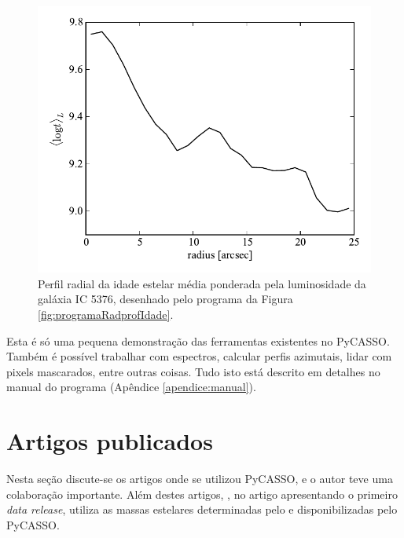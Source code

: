 \begin{figure}
	\includegraphics{figuras/radprof-idade}
	\caption[Perfil radial da idade estelar média da galáxia IC 5376] {Perfil
	radial da idade estelar média ponderada pela luminosidade da galáxia IC
	5376, desenhado pelo programa da Figura \ref{fig:programaRadprofIdade}.}
	\label{fig:radprofIdade}
\end{figure}

Esta é só uma pequena demonstração das ferramentas existentes no PyCASSO. Também
é possível trabalhar com espectros, calcular perfis azimutais, lidar com pixels
mascarados, entre outras coisas. Tudo isto está descrito em detalhes no manual
do programa (Apêndice \ref{apendice:manual}).



\section{Artigos publicados}
\label{sec:pycasso:art}

Nesta seção discute-se os artigos onde se utilizou PyCASSO, e o autor teve uma
colaboração importante. Além destes artigos, \citet{Husemann2013}, no artigo
apresentando o primeiro {\em data release}, utiliza as massas estelares
determinadas pelo \starlight e disponibilizadas pelo PyCASSO.


